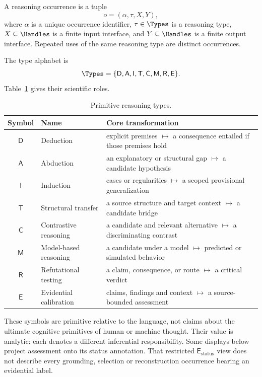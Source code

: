 \begin{definition}
A reasoning occurrence is a tuple
\[
  o=(\alpha,\tau,X,Y),
\]
where $\alpha$ is a unique occurrence identifier, $\tau\in\Types$ is a
reasoning type, $X\subseteq\Handles$ is a finite input interface, and
$Y\subseteq\Handles$ is a finite output interface. Repeated uses of the same
reasoning type are distinct occurrences.
\end{definition}

The type alphabet is
\[
  \Types=\{\mathsf{D},\mathsf{A},\mathsf{I},\mathsf{T},
  \mathsf{C},\mathsf{M},\mathsf{R},\mathsf{E}\}.
\]
Table~\ref{tab:types} gives their scientific roles.

\begin{table}[t]
\centering
\caption{Primitive reasoning types.}\label{tab:types}
\begin{tabularx}{\textwidth}{@{}c l X@{}}
\toprule
Symbol & Name & Core transformation \\
\midrule
$\mathsf{D}$ & Deduction &
  explicit premises $\mapsto$ a consequence entailed if those premises hold \\
$\mathsf{A}$ & Abduction &
  an explanatory or structural gap $\mapsto$ a candidate hypothesis \\
$\mathsf{I}$ & Induction &
  cases or regularities $\mapsto$ a scoped provisional generalization \\
$\mathsf{T}$ & Structural transfer &
  a source structure and target context $\mapsto$ a candidate bridge \\
$\mathsf{C}$ & Contrastive reasoning &
  a candidate and relevant alternative $\mapsto$ a discriminating contrast \\
$\mathsf{M}$ & Model-based reasoning &
  a candidate under a model $\mapsto$ predicted or simulated behavior \\
$\mathsf{R}$ & Refutational testing &
  a claim, consequence, or route $\mapsto$ a critical verdict \\
$\mathsf{E}$ & Evidential calibration &
  claims, findings and context $\mapsto$ a source-bounded assessment \\
\bottomrule
\end{tabularx}
\end{table}

These symbols are primitive relative to the language, not claims about the
ultimate cognitive primitives of human or machine thought. Their value is
analytic: each denotes a different inferential responsibility.
Some displays below project assessment onto its status annotation. That restricted
$\mathsf{E}_{\mathrm{status}}$ view does not describe every grounding, selection
or reconstruction occurrence bearing an evidential label.

